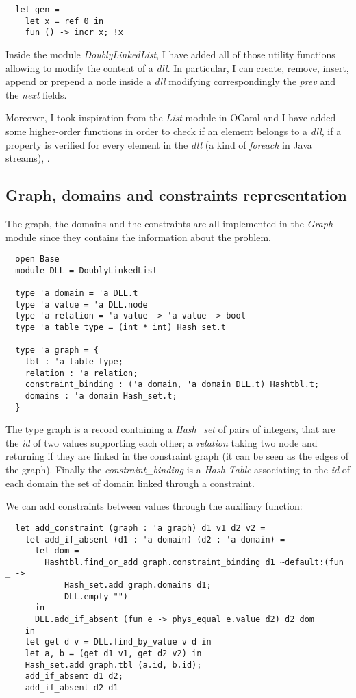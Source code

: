 \documentclass{rapport}
\begin{document}
\begin{verbatim}
  let gen =
    let x = ref 0 in
    fun () -> incr x; !x
\end{verbatim}

Inside the module \textit{DoublyLinkedList}, I have added all of those utility functions allowing to modify the content of a \textit{dll}. In particular, I can create, remove, insert, append or prepend a node inside a \textit{dll} modifying correspondingly the \textit{prev} and the \textit{next} fields.

Moreover, I took inspiration from the \textit{List} module in OCaml and I have added some higher-order functions in order to check if an element belongs to a \textit{dll}, if a property is verified for every element in the \textit{dll} (a kind of \textit{foreach} in Java streams), \etc.

\subsection{Graph, domains and constraints representation}

The graph, the domains and the constraints are all implemented in the \textit{Graph} module since they contains the information about the problem.

\begin{verbatim}
  open Base
  module DLL = DoublyLinkedList
  
  type 'a domain = 'a DLL.t
  type 'a value = 'a DLL.node
  type 'a relation = 'a value -> 'a value -> bool
  type 'a table_type = (int * int) Hash_set.t

  type 'a graph = {
    tbl : 'a table_type;
    relation : 'a relation;
    constraint_binding : ('a domain, 'a domain DLL.t) Hashtbl.t;
    domains : 'a domain Hash_set.t;
  }
\end{verbatim}

The type graph is a record containing a \textit{Hash\_set} of pairs of integers, that are the \textit{id} of two values supporting each other; a \textit{relation} taking two node and returning if they are linked in the constraint graph (it can be seen as the edges of the graph). Finally the \textit{constraint\_binding} is a \textit{Hash-Table} associating to the \textit{id} of each domain the set of domain linked through a constraint.

We can add constraints between values through the auxiliary function:

\begin{verbatim}
  let add_constraint (graph : 'a graph) d1 v1 d2 v2 =
    let add_if_absent (d1 : 'a domain) (d2 : 'a domain) =
      let dom =
        Hashtbl.find_or_add graph.constraint_binding d1 ~default:(fun _ ->
            Hash_set.add graph.domains d1;
            DLL.empty "")
      in
      DLL.add_if_absent (fun e -> phys_equal e.value d2) d2 dom
    in
    let get d v = DLL.find_by_value v d in
    let a, b = (get d1 v1, get d2 v2) in
    Hash_set.add graph.tbl (a.id, b.id);
    add_if_absent d1 d2;
    add_if_absent d2 d1
\end{verbatim}
\end{document}
